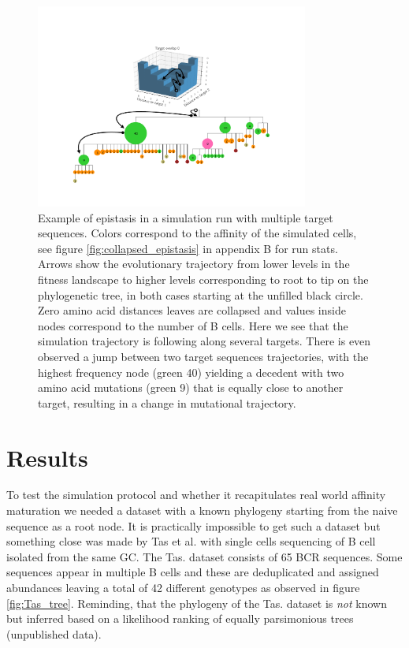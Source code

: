 \begin{figure}[!ht]
    \begin{center}
    \includegraphics[width=0.8\textwidth]{figures/epistasis_figure.pdf}
        \caption{
        \label{fig:epistasis_figure}
        Example of epistasis in a simulation run with multiple target sequences.
        Colors correspond to the affinity of the simulated cells, see figure \ref{fig:collapsed_epistasis} in appendix B for run stats.
        Arrows show the evolutionary trajectory from lower levels in the fitness landscape to higher levels corresponding to root to tip on the phylogenetic tree, in both cases starting at the unfilled black circle.
        Zero amino acid distances leaves are collapsed and values inside nodes correspond to the number of B cells.
        Here we see that the simulation trajectory is following along several targets.
        There is even observed a jump between two target sequences trajectories, with the highest frequency node (green 40) yielding a decedent with two amino acid mutations (green 9) that is equally close to another target, resulting in a change in mutational trajectory.
        }
    \end{center}
\end{figure}








\section{Results}
To test the simulation protocol and whether it recapitulates real world affinity maturation we needed a dataset with a known phylogeny starting from the naive sequence as a root node.
It is practically impossible to get such a dataset but something close was made by Tas et al. \cite{tas2016visualizing} with single cells sequencing of B cell isolated from the same GC.
The Tas. dataset consists of 65 BCR sequences.
Some sequences appear in multiple B cells and these are deduplicated and assigned abundances leaving a total of 42 different genotypes as observed in figure \ref{fig:Tas_tree}.
Reminding, that the phylogeny of the Tas. dataset is \textit{not} known but inferred based on a likelihood ranking of equally parsimonious trees (unpublished data).


